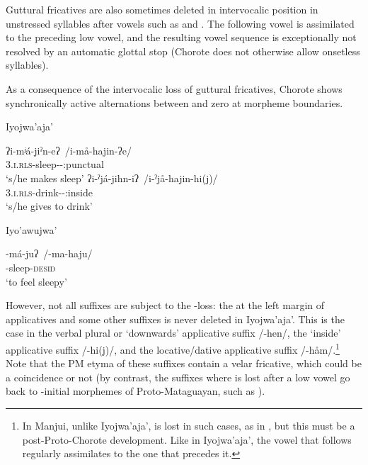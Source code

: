 \begin{exe}
    \ex \shaman
    \ex \nightncw \label{hon-an-nightncw}
    \ex \earthcw \label{hon-an-earthcw}
    \ex \tuscaf \label{hon-an-tuscaf}
    \ex \tuscat \label{hon-an-tuscat}
    \ex \tuscag \label{hon-an-tuscag}
\end{exe}

Guttural fricatives are also sometimes deleted in intervocalic position in unstressed syllables after vowels such as  and . The following vowel is assimilated to the preceding low vowel, and the resulting vowel sequence is exceptionally not resolved by an automatic glottal stop (Chorote does not otherwise allow onsetless syllables).

\begin{exe}
    \ex \mouth
    \ex \watch
    \ex \earcw
\end{exe}

As a consequence of the intervocalic loss of guttural fricatives, Chorote shows synchronically active alternations between  and zero at morpheme boundaries.

\ea
Iyojwa'aja' \citep{JC14a}
    \begin{xlist}
        \ex \gll ʔi-mʲá-jiˀn-eʔ~/i\mbox{-}må\mbox{-}hajin\mbox{-}ʔe/\\
        3.\textsc{i.rls}-sleep-\CAUS-\APPL:punctual\\
        \glt `s/he makes sleep'
        \ex \gll ʔi-ˀjá-jihn-iʔ~/i\mbox{-}ˀjå\mbox{-}hajin\mbox{-}hi(j)/\\
        3.\textsc{i.rls}-drink-\CAUS-\APPL:inside\\
        \glt `s/he gives to drink'
    \end{xlist}
\z

\ea
Iyo'awujwa' \citep[105]{AG83}
    \begin{xlist}
        \ex \gll -má-juʔ~/\mbox{-}ma\mbox{-}haju/\\
        -sleep-\textsc{desid}\\
        \glt `to feel sleepy'
    \end{xlist}
\z

However, not all suffixes are subject to the \mbox{-}loss: the  at the left margin of applicatives and some other suffixes is never deleted in Iyojwa'aja'. This is the case in the verbal plural or `downwards' applicative suffix /\mbox{-}hen/, the `inside' applicative suffix /\mbox{-}hi(j)/, and the locative/dative applicative suffix /\mbox{-}håm/.\footnote{In Manjui, unlike Iyojwa’aja’,  is lost in such cases, as in , but this must be a post-Proto-Chorote development. Like in Iyojwa'aja', the vowel that follows  regularly assimilates to the one that precedes it.} Note that the PM etyma of these suffixes contain a velar fricative, which could be a coincidence or not (by contrast, the suffixes where  is lost after a low vowel go back to \mbox{-}initial morphemes of Proto-Mataguayan, such as ).

